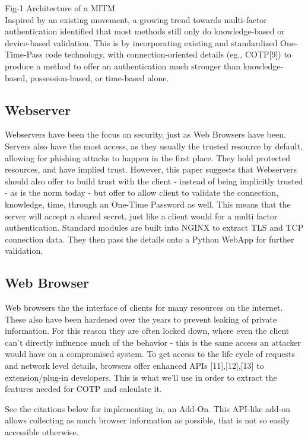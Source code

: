 \documentclass[a4paper, 11pt]{article} 				%
\begin{document}
Fig-1 Architecture of a MITM\\ 

Inspired by an existing movement, a growing trend towards multi-factor authentication
identified that most methods still only do knowledge-based or device-based validation. This is by incorporating existing and standardized One-Time-Pass code technology, with connection-oriented details (eg., COTP[9]) to produce a method to offer an authentication much stronger than knowledge-based, possession-based, or time-based alone. 

\subsection{Webserver}
Webservers have been the focus on security, just as Web Browsers have been. Servers also have the most access, as they usually the trusted resource by default, allowing for phishing attacks to happen in the first place. They hold protected resources, and have implied trust. However, this paper suggests that Webservers should also offer to build trust with the client - instead of being implicitly trusted - as is the norm today - but offer to allow client to validate the connection, knowledge, time, through an One-Time Password as well. This means that the server will accept a shared secret, just like a client would for a multi factor authentication. Standard modules are built into NGINX to extract TLS and TCP connection data. They then pass the details onto a Python WebApp for further validation.

\subsection{Web Browser}
Web browsers the the interface of clients for many resources on the internet. These also have been hardened over the years to prevent leaking of private information. For this reason they are often locked down, where even the client can't directly influence much of the behavior - this is the same access an attacker would have on a compromised system. To get access to the life cycle of requests and network level details, browsers offer enhanced APIs [11],[12],[13] to extension/plug-in developers. This is what we'll use in order to extract the features needed for COTP and calculate it.

\noindent
[10][11][12][13]See the citations below for implementing in, an Add-On. This API-like add-on allows collecting as much browser information as possible, that is not so easily accessible otherwise.\\
\end{document}
